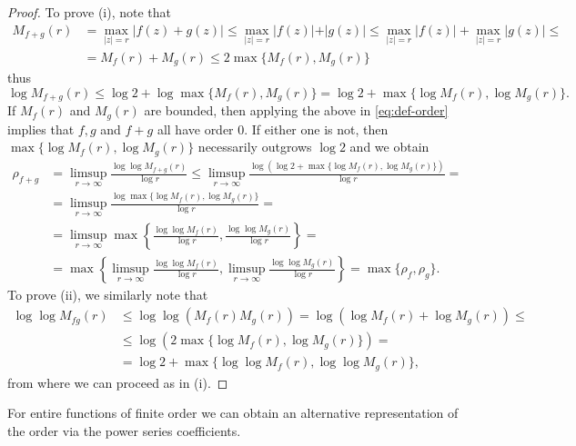 \begin{proof}
    To prove (i), note that
    \begin{align*}
        M_{f+g}(r) &= \max_{\vert z \vert = r} \vert f(z) + g(z) \vert \leq \max_{\vert z \vert = r} \vert f(z) \vert + \vert g(z) \vert \leq \max_{\vert z \vert = r} \vert f(z) \vert + \max_{\vert z \vert = r} \vert g(z) \vert \leq \\
        &= M_f(r) + M_g(r) \leq 2 \max \{ M_f(r), M_g(r) \}
    \end{align*}
    thus
    $$ \log M_{f+g}(r) \leq \log 2 + \log \max \{ M_f(r), M_g(r) \} = \log 2 + \max \{ \log M_f(r), \log M_g(r) \}. $$
    If $M_f(r)$ and $M_g(r)$ are bounded, then applying the above in \cref{eq:def-order} implies that $f, g$ and $f+g$ all have order $0$. If either one is not, then $\max \{ \log M_f(r), \log M_g(r) \}$ necessarily outgrows $\log 2$ and we obtain
    \begin{align*}
        \rho_{f+g} &= \limsup_{r \to \infty} \frac{\log \log M_{f+g}(r)}{\log r} \leq \limsup_{r \to \infty} \frac{\log (\log 2 + \max \{ \log M_f(r), \log M_g(r) \})}{\log r} = \\
        &= \limsup_{r \to \infty} \frac{\log \max \{ \log M_f(r), \log M_g(r) \}}{\log r} = \\
        &= \limsup_{r \to \infty} \max \left\{ \frac{\log \log M_f(r)}{\log r}, \frac{\log \log M_g(r)}{\log r} \right\} = \\
        &= \max \left\{ \limsup_{r \to \infty} \frac{\log \log M_f(r)}{\log r}, \limsup_{r \to \infty} \frac{\log \log M_g(r)}{\log r} \right\} = \max \{ \rho_f, \rho_g \}.
    \end{align*}
    To prove (ii), we similarly note that
    \begin{align*}
        \log \log M_{fg}(r) &\leq \log \log ( M_f(r) M_g(r) ) = \log (\log M_f(r) + \log M_g(r)) \leq \\
        &\leq \log (2 \max \{ \log M_f(r), \log M_g(r) \}) = \\
        &= \log 2 + \max \{ \log \log M_f(r), \log \log M_g(r) \},
    \end{align*}
    from where we can proceed as in (i).
\end{proof}

For entire functions of finite order we can obtain an alternative representation of the order via the power series coefficients.


